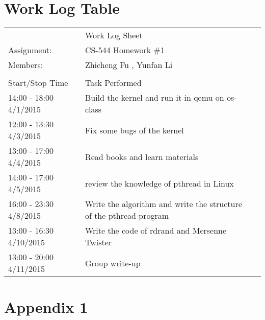 \documentclass[letterpaper,10pt,titlepage]{article}
\begin{document}
\section{Work Log Table}
\begin{table}[h]
\begin{tabular}{lll}
                        & Work Log Sheet                                                     &  \\
Assignment:             & CS-544 Homework \#1                                                &  \\
Members:                & Zhicheng Fu , Yunfan Li                                            &  \\
                        &                                                                    &  \\
Start/Stop Time         & Task Performed                                                     &  \\
14:00 - 18:00 4/1/2015  & Build the kernel and run it in qemu on os-class                    &  \\
12:00 - 13:30 4/3/2015  & Fix some bugs of the kernel                                        &  \\
13:00 - 17:00 4/4/2015  & Read books and learn materials                                     &  \\
14:00 - 17:00 4/5/2015  & review the knowledge of pthread in Linux                           &  \\
16:00 - 23:30 4/8/2015  & Write the algorithm and write the structure of the pthread program &  \\
13:00 - 16:30 4/10/2015 & Write the code of rdrand and Mersenne Twister                      &  \\
13:00 - 20:00 4/11/2015 & Group write-up                                                     &  \\
\end{tabular}
\end{table}
\section*{Appendix 1}

\end{document}
